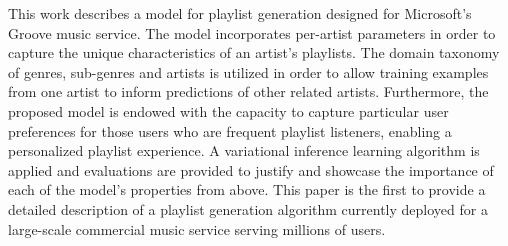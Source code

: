 This work describes a model for playlist generation designed for Microsoft's Groove music service. The model incorporates per-artist parameters in order to capture the unique characteristics of an artist's playlists. The domain taxonomy of genres, sub-genres and artists is utilized in order to allow training examples from one artist to inform predictions of other related artists. 
Furthermore, the proposed model is endowed with the capacity to capture particular user preferences for those users who are frequent playlist listeners, enabling a personalized playlist experience. %
A variational inference learning algorithm is applied and evaluations are provided to justify and showcase the importance of each of the model's properties from above. 
This paper is the first to provide a detailed description of a playlist generation algorithm currently deployed for a large-scale commercial music service serving millions of users. 

